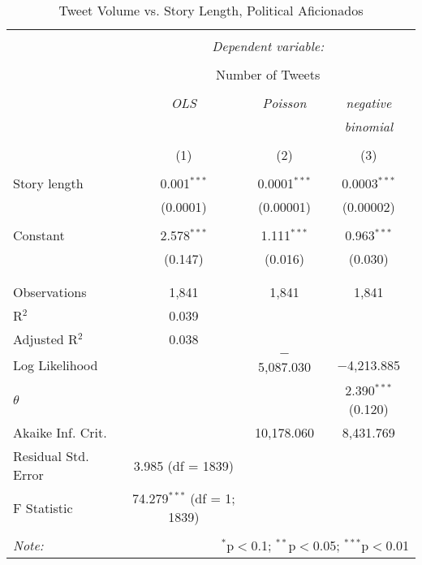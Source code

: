 \begin{table}[!htbp] \centering 
  \caption{Tweet Volume vs. Story Length, Political Aficionados} 
  \label{} 
    \begin{tabular}{@{\extracolsep{5pt}}lccc} 
    \\[-1.8ex]\hline 
    \hline \\[-1.8ex] 
     & \multicolumn{3}{c}{\textit{Dependent variable:}} \\ 
    \cline{2-4} 
    \\[-1.8ex] & \multicolumn{3}{c}{Number of Tweets} \\ 
    \\[-1.8ex] & \textit{OLS} & \textit{Poisson} & \textit{negative} \\ 
     & \textit{} & \textit{} & \textit{binomial} \\ 
    \\[-1.8ex] & (1) & (2) & (3)\\ 
    \hline \\[-1.8ex] 
     Story length & 0.001$^{***}$ & 0.0001$^{***}$ & 0.0003$^{***}$ \\ 
      & (0.0001) & (0.00001) & (0.00002) \\ 
      & & & \\ 
     Constant & 2.578$^{***}$ & 1.111$^{***}$ & 0.963$^{***}$ \\ 
      & (0.147) & (0.016) & (0.030) \\ 
      & & & \\ 
    \hline \\[-1.8ex] 
    Observations & 1,841 & 1,841 & 1,841 \\ 
    R$^{2}$ & 0.039 &  &  \\ 
    Adjusted R$^{2}$ & 0.038 &  &  \\ 
    Log Likelihood &  & $-$5,087.030 & $-$4,213.885 \\ 
    $\theta$ &  &  & 2.390$^{***}$  (0.120) \\ 
    Akaike Inf. Crit. &  & 10,178.060 & 8,431.769 \\ 
    Residual Std. Error & 3.985 (df = 1839) &  &  \\ 
    F Statistic & 74.279$^{***}$ (df = 1; 1839) &  &  \\ 
    \hline 
    \hline \\[-1.8ex] 
    \textit{Note:}  & \multicolumn{3}{r}{$^{*}$p$<$0.1; $^{**}$p$<$0.05; $^{***}$p$<$0.01} \\ 
    \end{tabular} 
\end{table} 
